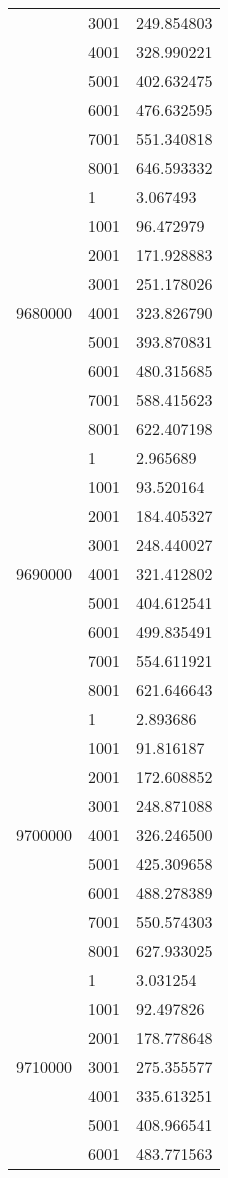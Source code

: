 \begin{table}[htb!]
\begin{tabular}{lll}
 & 3001 & 249.854803 \\
 & 4001 & 328.990221 \\
 & 5001 & 402.632475 \\
 & 6001 & 476.632595 \\
 & 7001 & 551.340818 \\
 & 8001 & 646.593332 \\
\multirow[c]{9}{*}{9680000} & 1 & 3.067493 \\
 & 1001 & 96.472979 \\
 & 2001 & 171.928883 \\
 & 3001 & 251.178026 \\
 & 4001 & 323.826790 \\
 & 5001 & 393.870831 \\
 & 6001 & 480.315685 \\
 & 7001 & 588.415623 \\
 & 8001 & 622.407198 \\
\multirow[c]{9}{*}{9690000} & 1 & 2.965689 \\
 & 1001 & 93.520164 \\
 & 2001 & 184.405327 \\
 & 3001 & 248.440027 \\
 & 4001 & 321.412802 \\
 & 5001 & 404.612541 \\
 & 6001 & 499.835491 \\
 & 7001 & 554.611921 \\
 & 8001 & 621.646643 \\
\multirow[c]{9}{*}{9700000} & 1 & 2.893686 \\
 & 1001 & 91.816187 \\
 & 2001 & 172.608852 \\
 & 3001 & 248.871088 \\
 & 4001 & 326.246500 \\
 & 5001 & 425.309658 \\
 & 6001 & 488.278389 \\
 & 7001 & 550.574303 \\
 & 8001 & 627.933025 \\
\multirow[c]{9}{*}{9710000} & 1 & 3.031254 \\
 & 1001 & 92.497826 \\
 & 2001 & 178.778648 \\
 & 3001 & 275.355577 \\
 & 4001 & 335.613251 \\
 & 5001 & 408.966541 \\
 & 6001 & 483.771563 \\

\end{tabular}
\end{table}
